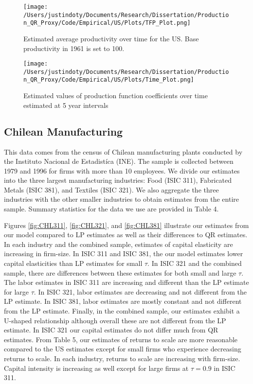 \documentclass[11pt]{article}
\begin{document}
\begin{figure}[H]
\centering
\texttt{[image: /Users/justindoty/Documents/Research/Dissertation/Production\_QR\_Proxy/Code/Empirical/US/Plots/TFP\_Plot.png]}
\caption{Estimated average productivity over time for the US. Base productivity in 1961 is set to 100.}
\label{fig:USpgrowth}
\end{figure}

\begin{figure}[H]
\centering
\texttt{[image: /Users/justindoty/Documents/Research/Dissertation/Production\_QR\_Proxy/Code/Empirical/US/Plots/Time\_Plot.png]}
\caption{Estimated values of production function coefficients over time estimated at 5 year intervals}
\label{fig:UStimecoef}
\end{figure}



\subsection{Chilean Manufacturing}
This data comes from the census of Chilean manufacturing plants conducted by the Instituto Nacional de Estadist\'ica (INE). The sample is collected between 1979 and 1996 for firms with more than 10 employees. We divide our estimates into the three largest manufacturing industries: Food (ISIC 311), Fabricated Metals (ISIC 381), and Textiles (ISIC 321). We also aggregate the three industries with the other smaller industries to obtain estimates from the entire sample. Summary statistics for the data we use are provided in Table 4.

Figures \ref{fig:CHL311}, \ref{fig:CHL321}, and \ref{fig:CHL381} illustrate our estimates from our model compared to LP estimates as well as their differences to QR estimates. In each industry and the combined sample, estimates of capital elasticity are increasing in firm-size. In ISIC 311 and ISIC 381, the our model estimates lower capital elasticities than LP estimates for small $\tau$. In ISIC 321 and the combined sample, there are differences between these estimates for both small and large $\tau$. The labor estimates in ISIC 311 are increasing and different than the LP estimate for large $\tau$. In ISIC 321, labor estimates are decreasing and not different from the LP estimate. In ISIC 381, labor estimates are mostly constant and not different from the LP estimate. Finally, in the combined sample, our estimates exhibit a U-shaped relationship although overall these are not different from the LP estimate. In ISIC 321 our capital estimates do not differ much from QR estimates. From Table 5, our estimates of returns to scale are more reasonable compared to the US estimates except for small firms who experience decreasing returns to scale. In each industry, returns to scale are increasing with firm-size. Capital intensity is increasing as well except for large firms at $\tau=0.9$ in ISIC 311.
\end{document}
